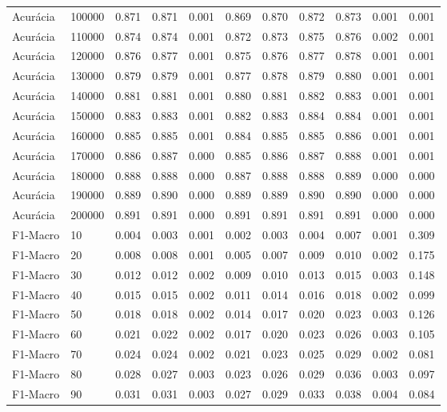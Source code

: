 \begin{table}[htbp]
\begin{table}
\begin{tabular}{ll|rrrrrrrrr}
Acurácia & 100000 & 0.871 & 0.871 & 0.001 & 0.869 & 0.870 & 0.872 & 0.873 & 0.001 & 0.001 \\
Acurácia & 110000 & 0.874 & 0.874 & 0.001 & 0.872 & 0.873 & 0.875 & 0.876 & 0.002 & 0.001 \\
Acurácia & 120000 & 0.876 & 0.877 & 0.001 & 0.875 & 0.876 & 0.877 & 0.878 & 0.001 & 0.001 \\
Acurácia & 130000 & 0.879 & 0.879 & 0.001 & 0.877 & 0.878 & 0.879 & 0.880 & 0.001 & 0.001 \\
Acurácia & 140000 & 0.881 & 0.881 & 0.001 & 0.880 & 0.881 & 0.882 & 0.883 & 0.001 & 0.001 \\
Acurácia & 150000 & 0.883 & 0.883 & 0.001 & 0.882 & 0.883 & 0.884 & 0.884 & 0.001 & 0.001 \\
Acurácia & 160000 & 0.885 & 0.885 & 0.001 & 0.884 & 0.885 & 0.885 & 0.886 & 0.001 & 0.001 \\
Acurácia & 170000 & 0.886 & 0.887 & 0.000 & 0.885 & 0.886 & 0.887 & 0.888 & 0.001 & 0.001 \\
Acurácia & 180000 & 0.888 & 0.888 & 0.000 & 0.887 & 0.888 & 0.888 & 0.889 & 0.000 & 0.000 \\
Acurácia & 190000 & 0.889 & 0.890 & 0.000 & 0.889 & 0.889 & 0.890 & 0.890 & 0.000 & 0.000 \\
Acurácia & 200000 & 0.891 & 0.891 & 0.000 & 0.891 & 0.891 & 0.891 & 0.891 & 0.000 & 0.000 \\
F1-Macro & 10 & 0.004 & 0.003 & 0.001 & 0.002 & 0.003 & 0.004 & 0.007 & 0.001 & 0.309 \\
F1-Macro & 20 & 0.008 & 0.008 & 0.001 & 0.005 & 0.007 & 0.009 & 0.010 & 0.002 & 0.175 \\
F1-Macro & 30 & 0.012 & 0.012 & 0.002 & 0.009 & 0.010 & 0.013 & 0.015 & 0.003 & 0.148 \\
F1-Macro & 40 & 0.015 & 0.015 & 0.002 & 0.011 & 0.014 & 0.016 & 0.018 & 0.002 & 0.099 \\
F1-Macro & 50 & 0.018 & 0.018 & 0.002 & 0.014 & 0.017 & 0.020 & 0.023 & 0.003 & 0.126 \\
F1-Macro & 60 & 0.021 & 0.022 & 0.002 & 0.017 & 0.020 & 0.023 & 0.026 & 0.003 & 0.105 \\
F1-Macro & 70 & 0.024 & 0.024 & 0.002 & 0.021 & 0.023 & 0.025 & 0.029 & 0.002 & 0.081 \\
F1-Macro & 80 & 0.028 & 0.027 & 0.003 & 0.023 & 0.026 & 0.029 & 0.036 & 0.003 & 0.097 \\
F1-Macro & 90 & 0.031 & 0.031 & 0.003 & 0.027 & 0.029 & 0.033 & 0.038 & 0.004 & 0.084 \\

\end{tabular}
\end{table}
\end{table}
